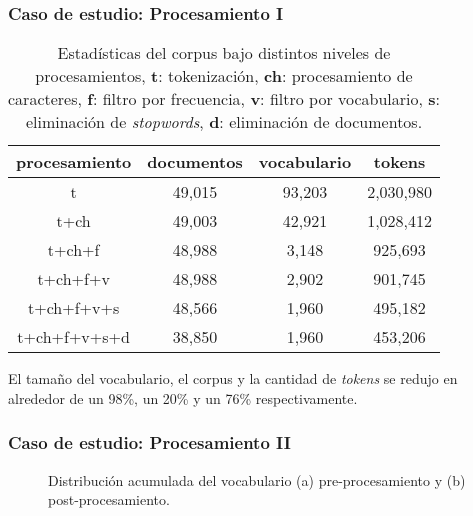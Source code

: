 \documentclass[
	spanish, %
	aspectratio=43, %
	hyperref={pdfencoding=auto,psdextra},
	xcolor={dvipsnames,table,usenames},
]{beamer}
\begin{document}
\begin{frame}[t]
\frametitle{Caso de estudio: Procesamiento I}

\begin{table}[H]
  \begin{tabular}{|c|c|c|c|}
  \hline
  procesamiento & documentos & vocabulario & tokens  \\ \hline
  t             & 49,015      & 93,203       & 2,030,980 \\ \hline
  t+ch          & 49,003      & 42,921       & 1,028,412 \\ \hline
  t+ch+f        & 48,988      & 3,148        & 925,693  \\ \hline
  t+ch+f+v      & 48,988      & 2,902        & 901,745  \\ \hline
  t+ch+f+v+s    & 48,566      & 1,960        & 495,182  \\ \hline
  t+ch+f+v+s+d  & 38,850      & 1,960        & 453,206  \\ \hline
  \end{tabular}
  \caption{Estadísticas del corpus bajo distintos niveles de procesamientos, \textbf{t}: tokenización, \textbf{ch}: procesamiento de caracteres, \textbf{f}: filtro por frecuencia, \textbf{v}: filtro por vocabulario, \textbf{s}: eliminación de \textit{stopwords}, \textbf{d}: eliminación de documentos.}
\end{table}

El tamaño del vocabulario, el corpus y la cantidad de \textit{tokens} se redujo en alrededor de un 98\%, un 20\% y un 76\% respectivamente.
\end{frame}


\begin{frame}[t]
\frametitle{Caso de estudio: Procesamiento II}

\begin{figure}
  \caption{Distribución acumulada del vocabulario (a) pre-procesamiento y (b) post-procesamiento.}
\end{figure}

\end{frame}
\end{document}
